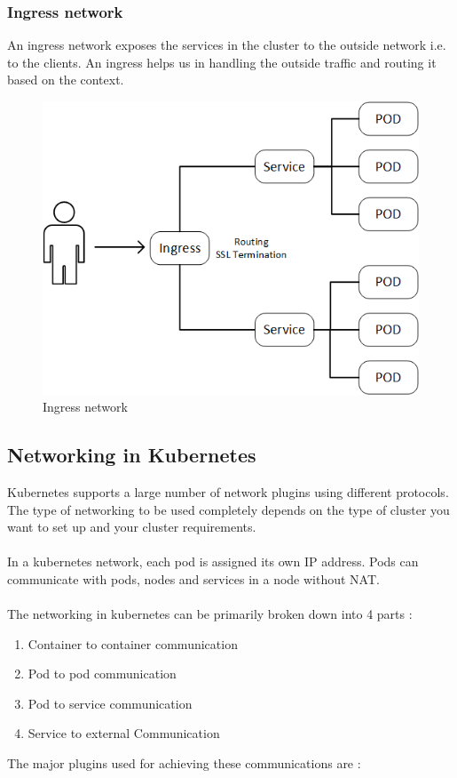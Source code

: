 \documentclass[12pt]{article}
\begin{document}
\subsubsection{Ingress network}
An ingress network exposes the services in the cluster to the outside network i.e. to the clients. An ingress helps us in handling the outside traffic and routing it based on the context.\\
\begin{figure}[h!]
	\begin{center}
		\includegraphics[totalheight=0.31\textheight]{ingress}
		\caption{Ingress network \cite{Ingress}}
	\end{center}
\end{figure}
\subsection{Networking in Kubernetes}
Kubernetes supports a large number of network plugins using different protocols. The type of networking to be used completely depends on the type of cluster you want to set up and your cluster requirements.\\\\
In a kubernetes network, each pod is assigned its own IP address. Pods can communicate with pods, nodes and services in a node without NAT. \\\\
The networking in kubernetes can be primarily broken down into 4 parts :
\begin{enumerate}
	\item Container to container communication
	\item Pod to pod communication
	\item Pod to service communication
	\item Service to external Communication
\end{enumerate}
The major plugins used for achieving these communications are :
\end{document}
